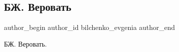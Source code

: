  
 
 
 
 
 
\subsection{БЖ. Веровать}
\label{sec:12_06_2021.fb.bilchenko_evgenia.1.verovat_poezia}
\ifcmt
 author_begin
   author_id bilchenko_evgenia
 author_end
\fi

БЖ. Веровать.

